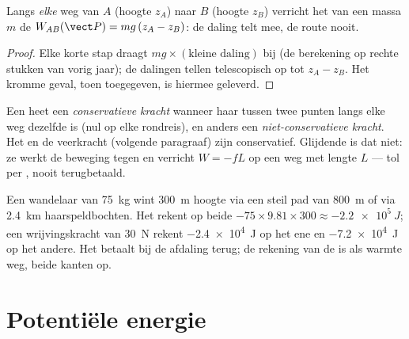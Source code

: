 \begin{proposition}\label{prop:g12:work-and-energy:weight}
Langs \emph{elke} weg van $A$ (hoogte $z_A$) naar $B$ (hoogte $z_B$) verricht
het  van een massa $m$ de  $W_{AB}(\vect P) = mg\,(z_A - z_B)$:
de daling telt mee, de route nooit.
\end{proposition}

\begin{proof}
Elke korte stap draagt $mg \times (\text{kleine daling})$ bij (de berekening
op rechte stukken van vorig jaar); de dalingen tellen telescopisch op tot
$z_A - z_B$. Het kromme geval, toen toegegeven, is hiermee geleverd.
\end{proof}

\begin{definition}\label{def:g12:work-and-energy:conservative}
Een  heet een \emph{conservatieve kracht}
wanneer haar  tussen twee punten langs elke weg dezelfde is (nul op elke
rondreis), en anders een \emph{niet-conservatieve
kracht}. Het  en de veerkracht
(volgende paragraaf) zijn conservatief. Glijdende  is dat niet: ze
werkt de beweging tegen en verricht $W = -fL$ op een weg met lengte $L$ ---
tol per , nooit terugbetaald.
\end{definition}

\begin{example}\label{ex:g12:work-and-energy:trails}
Een wandelaar van \qty{75}{kg} wint \qty{300}{m} hoogte via een steil pad van
\qty{800}{m} of via \qty{2.4}{km} haarspeldbochten. Het  rekent op
beide $-75 \times 9.81 \times 300 \approx \qty{-2.2e5}{J}$; een
wrijvingskracht van \qty{30}{N} rekent \qty{-2.4e4}{J} op het ene en
\qty{-7.2e4}{J} op het andere. Het  betaalt bij de afdaling terug; de
rekening van de  is als warmte weg, beide kanten op.
\end{example}

\section{Potentiële energie}

